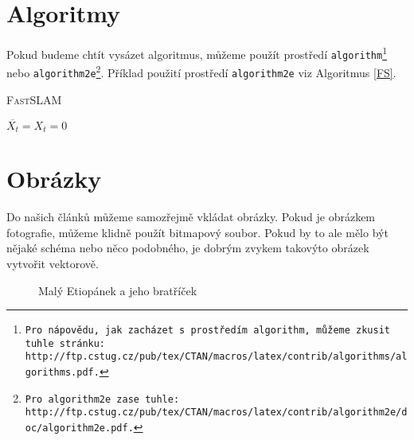 \documentclass[a4paper,11pt]{article}
\begin{document}
\section{Algoritmy}
\label{kap_3}
Pokud budeme chtít vysázet algoritmus, můžeme použít prostředí \texttt{algorithm\footnote{Pro nápovědu, jak zacházet s prostředím \texttt{algorithm}, můžeme zkusit tuhle stránku:\\
http://ftp.cstug.cz/pub/tex/CTAN/macros/latex/contrib/algorithms/algorithms.pdf.}} nebo \texttt{algorithm2e\footnote{Pro \texttt{algorithm2e} zase tuhle: http://ftp.cstug.cz/pub/tex/CTAN/macros/latex/contrib/algorithm2e/doc/algorithm2e.pdf.}}. Příklad použití prostředí \texttt{algorithm2e} viz Algoritmus \ref{FS}.

\begin{algorithm}
\label{FS}
\Indm
\caption{\textsc{\Indmm FastSLAM}}
\Indp

\SetNlSty{}{}{:}
$\overline{X_t} = X_t = 0$ \\


\end{algorithm}

\section{Obrázky}
Do našich článků můžeme samozřejmě vkládat obrázky. Pokud je obrázkem fotografie, můžeme klidně použít bitmapový soubor. Pokud by to ale mělo být nějaké schéma nebo něco podobného, je dobrým zvykem takovýto obrázek vytvořit vektorově.

\begin{figure}[h]
    \centering
    \caption{Malý Etiopánek a jeho bratříček}
    \label{etiopan}
\end{figure}
\end{document}

